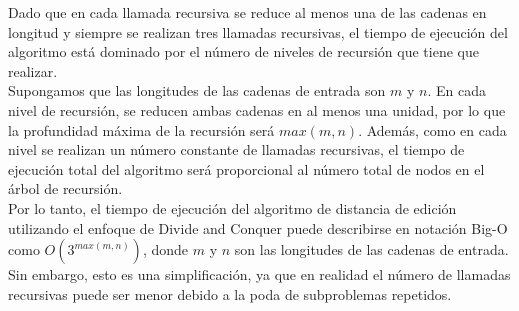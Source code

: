 Dado que en cada llamada recursiva se reduce al menos una de las cadenas en longitud y siempre se realizan tres llamadas recursivas, el tiempo de ejecución del algoritmo está dominado por el número de niveles de recursión que tiene que realizar.\\

Supongamos que las longitudes de las cadenas de entrada son $m$ y $n$. En cada nivel de recursión, se reducen ambas cadenas en al menos una unidad, por lo que la profundidad máxima de la recursión será $max(m, n)$. Además, como en cada nivel se realizan un número constante de llamadas recursivas, el tiempo de ejecución total del algoritmo será proporcional al número total de nodos en el árbol de recursión.\\

Por lo tanto, el tiempo de ejecución del algoritmo de distancia de edición utilizando el enfoque de Divide and Conquer puede describirse en notación Big-O como $O(3^{max(m, n)})$, donde $m$ y $n$ son las longitudes de las cadenas de entrada. Sin embargo, esto es una simplificación, ya que en realidad el número de llamadas recursivas puede ser menor debido a la poda de subproblemas repetidos.
